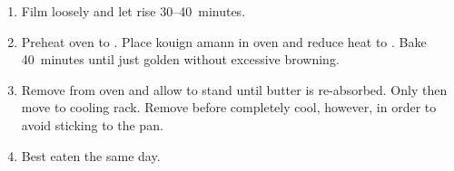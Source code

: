 \begin{recipe}
\begin{enumerate}
  \item Film loosely and let rise 30--40~minutes.
    
  \item Preheat oven to .  Place kouign amann in oven and
    reduce heat to .  Bake 40~minutes until just golden
    without excessive browning.
    
  \item Remove from oven and allow to stand until butter is
    re-absorbed.  Only then move to cooling rack.  Remove before
    completely cool, however, in order to avoid sticking to the pan.
    
  \item Best eaten the same day.

  \end{enumerate}
\end{recipe}

